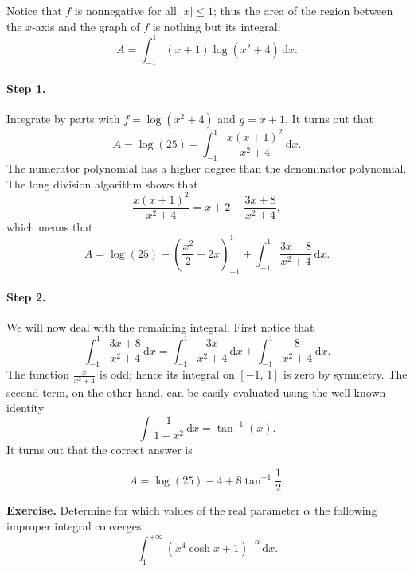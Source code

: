\documentclass[a4paper,10 pt]{report}
\newcommand{\finalanswer}[1]{%
    \begin{finalAnswer}
    \[
        #1
    \]
    \end{finalAnswer}
}
\theoremstyle{definition}
\begin{document}
\begin{solutionBox} Notice that $f$ is nonnegative for all $|x| \leq 1$; thus the area of the region between the $x$-axis and the graph of $f$ is nothing but its integral:
\begin{equation*}A = \int_{-1}^1 (x + 1) \log(x^2 + 4) \, \mathrm{d}x. \end{equation*}

\paragraph{Step 1.} Integrate by parts with $f = \log(x^2 + 4)$ and $g = x + 1$. It turns out that
\begin{equation*}A = \log(25) - \int_{-1}^1 \frac{x(x+1)^2}{x^2 + 4} \, \mathrm{d}x. \end{equation*}
The numerator polynomial has a higher degree than the denominator polynomial. The long division algorithm shows that
\begin{equation*}\frac{x(x+1)^2}{x^2 + 4} = x + 2 - \frac{3x + 8}{x^2 + 4}, \end{equation*}
which means that
\begin{equation*}A = \log(25) - \left( \frac{x^2}{2} + 2x \right)_{-1}^1 + \int_{-1}^1 \frac{3x + 8}{x^2 + 4} \, \mathrm{d}x. \end{equation*}

\paragraph{Step 2.} We will now deal with the remaining integral. First notice that
\begin{equation*}\int_{-1}^1 \frac{3x + 8}{x^2 + 4} \, \mathrm{d}x = \int_{-1}^1 \frac{3x}{x^2 + 4} \, \mathrm{d}x +  \int_{-1}^1 \frac{8}{x^2 + 4} \, \mathrm{d}x. \end{equation*}
The function $\frac{x}{x^2+4}$ is odd; hence its integral on $[-1, \, 1]$ is zero by symmetry. The second term, on the other hand, can be easily evaluated using the well-known identity
\begin{equation*}\int \frac{1}{1+x^2} \, \mathrm{d}x = \tan^{-1}(x). \end{equation*}
It turns out that the correct answer is
\finalanswer{
A = \log(25) - 4 + 8 \tan^{-1} \frac{1}{2}.
}\end{solutionBox}

\begin{exerciseBox} \textbf{Exercise.}  Determine for which values of the real parameter $\alpha$ the following improper integral converges:
\begin{equation*} \int_1^{+ \infty} \left( x^4 \cosh x + 1 \right)^{-\alpha} \, \mathrm{d}x. \end{equation*} \end{exerciseBox}
\end{document}
